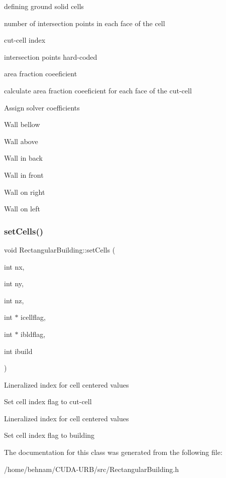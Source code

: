 defining ground solid cells

number of intersection points in each face of the cell

cut-\/cell index

intersection points hard-\/coded

area fraction coeeficient

calculate area fraction coeeficient for each face of the cut-\/cell

Assign solver coefficients

Wall bellow

Wall above

Wall in back

Wall in front

Wall on right

Wall on left \mbox{\label{classRectangularBuilding_ae2e0b496b0adf1b3e6961a42043f22c8}} 
\subsubsection{\texorpdfstring{set\+Cells()}{setCells()}}
{\footnotesize\ttfamily void Rectangular\+Building\+::set\+Cells (\begin{DoxyParamCaption}\item[{int}]{nx,  }\item[{int}]{ny,  }\item[{int}]{nz,  }\item[{int $\ast$}]{icellflag,  }\item[{int $\ast$}]{ibldflag,  }\item[{int}]{ibuild }\end{DoxyParamCaption})\hspace{0.3cm}{\ttfamily [inline]}}

Lineralized index for cell centered values

Set cell index flag to cut-\/cell

Lineralized index for cell centered values

Set cell index flag to building 

The documentation for this class was generated from the following file\+:\begin{DoxyCompactItemize}
\item 
/home/behnam/\+C\+U\+D\+A-\/\+U\+R\+B/src/Rectangular\+Building.\+h\end{DoxyCompactItemize}
